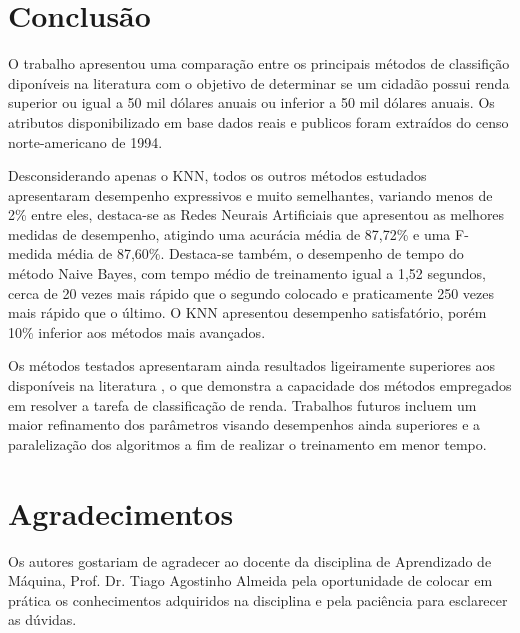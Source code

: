 \section{Conclusão}

O trabalho apresentou uma comparação entre os principais métodos de classifição diponíveis na literatura com o objetivo de determinar se um cidadão possui renda superior ou igual a 50 mil dólares anuais ou inferior a 50 mil dólares anuais. Os atributos disponibilizado em base dados reais e publicos foram extraídos do censo norte-americano de 1994.

Desconsiderando apenas o KNN, todos os outros métodos estudados apresentaram desempenho expressivos e muito semelhantes, variando menos de 2\% entre eles, destaca-se as Redes Neurais Artificiais que apresentou as melhores medidas de desempenho, atigindo uma acurácia média de 87,72\% e uma F-medida média de 87,60\%. Destaca-se também, o desempenho de tempo do método Naive Bayes, com tempo médio de treinamento igual a 1,52 segundos, cerca de 20 vezes mais rápido que o segundo colocado e praticamente 250 vezes mais rápido que o último. O KNN apresentou desempenho satisfatório, porém 10\% inferior aos métodos mais avançados.

Os métodos testados apresentaram ainda resultados ligeiramente superiores aos disponíveis na literatura \cite{base2}, o que demonstra a capacidade dos métodos empregados em resolver a tarefa de classificação de renda. Trabalhos futuros incluem um maior refinamento dos parâmetros visando desempenhos ainda superiores e a paralelização dos algoritmos a fim de realizar o treinamento em menor tempo.

\section*{Agradecimentos}
Os autores gostariam de agradecer ao docente da disciplina de Aprendizado de Máquina, Prof. Dr. Tiago Agostinho Almeida pela oportunidade de colocar em prática os conhecimentos adquiridos na disciplina e pela paciência para esclarecer as dúvidas.